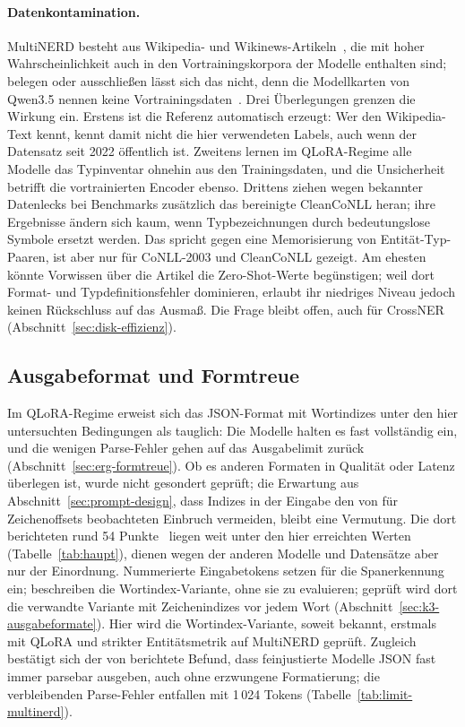 \paragraph{Datenkontamination.}
MultiNERD besteht aus Wikipedia- und
Wikinews-Artikeln~\cite{tedeschi2022multinerd}, die mit hoher
Wahrscheinlichkeit auch in den Vortrainingskorpora der Modelle enthalten
sind; belegen oder ausschließen
lässt sich das nicht, denn die Modellkarten von Qwen3.5 nennen keine
Vortrainingsdaten~\cite{qwen2026card27b}.
Drei Überlegungen grenzen die Wirkung ein.
Erstens ist die Referenz automatisch erzeugt: Wer den Wikipedia-Text
kennt, kennt damit nicht die hier verwendeten Labels, auch wenn der
Datensatz seit 2022 öffentlich ist.
Zweitens lernen im QLoRA-Regime alle Modelle das Typinventar ohnehin aus
den Trainingsdaten, und die Unsicherheit betrifft die vortrainierten
Encoder ebenso.
Drittens ziehen \textcite{zhan2026generativeNER} wegen bekannter
Datenlecks bei Benchmarks zusätzlich das bereinigte CleanCoNLL heran;
ihre Ergebnisse ändern sich kaum, wenn Typbezeichnungen durch
bedeutungslose Symbole ersetzt werden. Das spricht gegen eine
Memorisierung von Entität-Typ-Paaren, ist aber nur für CoNLL-2003 und
CleanCoNLL gezeigt.
Am ehesten könnte Vorwissen über die Artikel die Zero-Shot-Werte
begünstigen; weil dort Format- und Typdefinitionsfehler dominieren,
erlaubt ihr niedriges Niveau jedoch keinen Rückschluss auf das Ausmaß.
Die Frage bleibt offen, auch für CrossNER
(Abschnitt~\ref{sec:disk-effizienz}).

\subsection{Ausgabeformat und Formtreue}
\label{sec:disk-format}

Im QLoRA-Regime erweist sich das JSON-Format mit Wortindizes unter den
hier untersuchten Bedingungen als tauglich: Die Modelle halten es fast
vollständig ein, und die wenigen Parse-Fehler gehen auf das Ausgabelimit
zurück (Abschnitt~\ref{sec:erg-formtreue}).
Ob es anderen Formaten in Qualität oder Latenz überlegen ist, wurde nicht
gesondert geprüft; die Erwartung aus
Abschnitt~\ref{sec:prompt-design}, dass Indizes in der Eingabe den von
\textcite{zhan2026generativeNER} für Zeichenoffsets beobachteten
Einbruch vermeiden, bleibt eine Vermutung.
Die dort berichteten rund 54 Punkte~\cite[Tab.~3]{zhan2026generativeNER}
liegen weit unter den hier erreichten Werten (Tabelle~\ref{tab:haupt}),
dienen wegen der anderen Modelle und Datensätze aber nur der Einordnung.
Nummerierte Eingabetokens setzen
\textcite[Tab.~9; Ergebnisse in Tab.~3]{ramponi2025fallacy} für die
Spanerkennung ein;
\textcite{semin2026spanLabeling} beschreiben die Wortindex-Variante,
ohne sie zu evaluieren; geprüft wird dort die verwandte Variante mit
Zeichenindizes vor jedem Wort (Abschnitt~\ref{sec:k3-ausgabeformate}).
Hier wird die Wortindex-Variante, soweit bekannt, erstmals mit
QLoRA und strikter Entitätsmetrik auf MultiNERD geprüft.
Zugleich bestätigt sich der von \textcite{dagdelen2024structuredIE}
berichtete Befund, dass feinjustierte Modelle JSON fast immer parsebar
ausgeben, auch ohne erzwungene Formatierung; die verbleibenden
Parse-Fehler entfallen mit 1\,024 Tokens (Tabelle~\ref{tab:limit-multinerd}).

